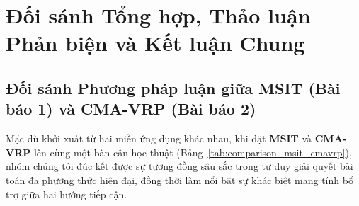 \documentclass[conference,10pt]{IEEEtran}
\begin{document}
\section{Đối sánh Tổng hợp, Thảo luận Phản biện và Kết luận Chung}

\subsection{Đối sánh Phương pháp luận giữa MSIT (Bài báo 1) và CMA-VRP (Bài báo 2)}

Mặc dù khởi xuất từ hai miền ứng dụng khác nhau, khi đặt \textbf{MSIT} và \textbf{CMA-VRP} lên cùng một bàn cân học thuật (Bảng~\ref{tab:comparison_msit_cmavrp}), nhóm chúng tôi đúc kết được sự tương đồng sâu sắc trong tư duy giải quyết bài toán đa phương thức hiện đại, đồng thời làm nổi bật sự khác biệt mang tính bổ trợ giữa hai hướng tiếp cận.
\end{document}
